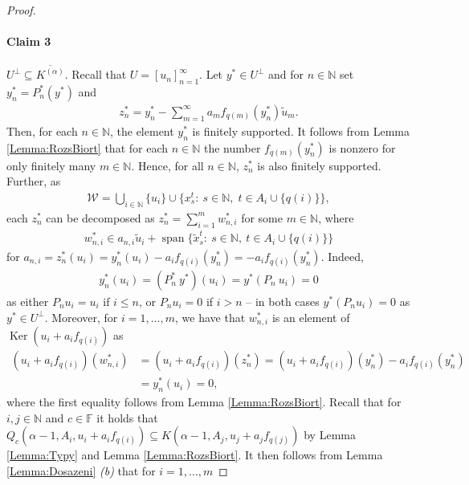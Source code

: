 \documentclass{amsart}
\theoremstyle{definition}
\begin{document}
\begin{proof}
    \paragraph*{\textbf{Claim 3}} $U^\perp \subseteq \overline{K^{(\alpha)}}$. Recall that $U = [u_n]_{n=1}^\infty$. Let $y^* \in U^\perp$ and for $n \in \mathbb{N}$ set $y_n^* = P_n^*(y^*)$ and
    \begin{align*}
        z_n^* = y_n^* - \sum_{m=1}^\infty a_m f_{q(m)} (y_n^*) \widetilde{u}_m.
    \end{align*} 
    Then, for each $n \in \mathbb{N}$, the element $y_n^*$ is finitely supported. It follows from Lemma \ref{Lemma:RozsBiort} that for each $n \in \mathbb{N}$ the number $f_{q(m)}(y_n^*)$ is nonzero for only finitely many $m \in \mathbb{N}$. Hence, for all $n \in \mathbb{N}$, $z_n^*$ is also finitely supported. Further, as
    \begin{align*}
        \mathcal{W} = \bigcup_{i \in \mathbb{N}} \{u_i\} \cup \{x^t_s : \: s \in \mathbb{N}, \; t \in A_i \cup \{q(i)\}\},
    \end{align*}
    each $z_n^*$ can be decomposed as $z_n^* = \sum_{i=1}^m w_{n,i}^*$ for some $m \in \mathbb{N}$, where
    \begin{align*}
        w_{n,i}^* \in a_{n,i} \widetilde{u}_i + \operatorname{span} \{\widetilde{x}^t_s : \: s \in \mathbb{N}, \: t \in A_i \cup \{q(i)\}\}
    \end{align*}
    for $a_{n,i} = z_n^*(u_i) = y_n^*(u_i) - a_i f_{q(i)}(y_n^*) = - a_i f_{q(i)}(y_n^*)$. Indeed,
    \begin{align*}
        y_n^*(u_i) = (P_n^* \: y^*)(u_i) = y^* (P_n \: u_i) = 0
    \end{align*}
    as either $P_n u_i = u_i$ if $i \leq n$, or $P_n u_i = 0$ if $i > n$ -- in both cases $y^*(P_n u_i) = 0$ as $y^* \in U^\perp$. Moreover, for $i=1,\dots,m$, we have that $w_{n,i}^*$ is an element of $\operatorname{Ker}(u_i + a_i f_{q(i)})$ as
    \begin{align*}
        (u_i + a_i f_{q(i)}) (w_{n,i}^*) &= (u_i + a_i f_{q(i)}) (z_n^*) = (u_i + a_i f_{q(i)}) (y_n^*) - a_i f_{q(i)}(y_n^*) \\
        &= y_n^*(u_i) = 0,
    \end{align*}
    where the first equality follows from Lemma \ref{Lemma:RozsBiort}. Recall that for $i,j \in \mathbb{N}$ and $c \in \mathbb{F}$ it holds that $Q_c(\alpha-1,A_i,u_i+a_if_{q(i)}) \subseteq K(\alpha-1,A_j,u_j+a_jf_{q(j)})$ by Lemma \ref{Lemma:Typy} and Lemma \ref{Lemma:RozsBiort}. It then follows from Lemma \ref{Lemma:Dosazeni} \textit{(b)} that for $i=1,\dots,m$

\end{proof}
\end{document}
